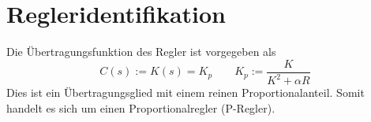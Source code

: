 \section{Regleridentifikation}
Die Übertragungsfunktion des Regler ist vorgegeben als
\[
	C(s) := K(s) = K_p	\qquad K_p := \frac{K}{K^2 + \alpha R}
\]
Dies ist ein Übertragungsglied mit einem reinen Proportionalanteil.
Somit handelt es sich um einen Proportionalregler (P-Regler).
